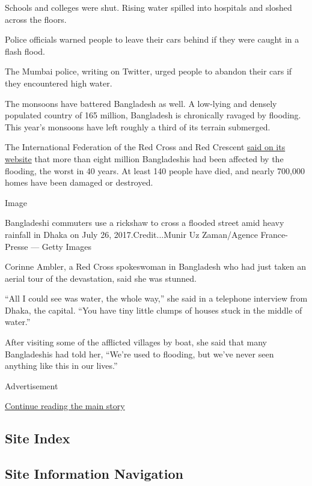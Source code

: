 Schools and colleges were shut. Rising water spilled into hospitals and
sloshed across the floors.

Police officials warned people to leave their cars behind if they were
caught in a flash flood.

The Mumbai police, writing on Twitter, urged people to abandon their
cars if they encountered high water.

The monsoons have battered Bangladesh as well. A low-lying and densely
populated country of 165 million, Bangladesh is chronically ravaged by
flooding. This year's monsoons have left roughly a third of its terrain
submerged.

The International Federation of the Red Cross and Red Crescent
\href{http://media.ifrc.org/ifrc/2017/08/28/millions-flood-affected-people-bangladesh-live-life-uncertainty-despite-decreasing-water-levels/}{said
on its website} that more than eight million Bangladeshis had been
affected by the flooding, the worst in 40 years. At least 140 people
have died, and nearly 700,000 homes have been damaged or destroyed.

Image

Bangladeshi commuters use a rickshaw to cross a flooded street amid
heavy rainfall in Dhaka on July 26, 2017.Credit...Munir Uz Zaman/Agence
France-Presse --- Getty Images

Corinne Ambler, a Red Cross spokeswoman in Bangladesh who had just taken
an aerial tour of the devastation, said she was stunned.

``All I could see was water, the whole way,'' she said in a telephone
interview from Dhaka, the capital. ``You have tiny little clumps of
houses stuck in the middle of water.''

After visiting some of the afflicted villages by boat, she said that
many Bangladeshis had told her, ``We're used to flooding, but we've
never seen anything like this in our lives.''

Advertisement

\protect\hyperlink{after-bottom}{Continue reading the main story}

\hypertarget{site-index}{%
\subsection{Site Index}\label{site-index}}

\hypertarget{site-information-navigation}{%
\subsection{Site Information
Navigation}\label{site-information-navigation}}


